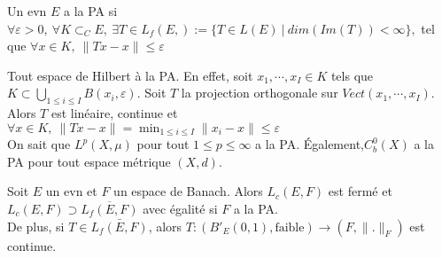 \begin{definition}
    Un evn $E$ a la PA si\\
    $\forall \varepsilon >0,\ \forall K\subset _CE,\ \exists T\in L_f(E,):=\{T\in L(E)\ |\ dim(Im(T))<\infty \} , $ tel que $\forall x\in K,\ \|Tx-x\|\le \varepsilon  $
\end{definition}
\begin{ex}
    Tout espace de Hilbert à la PA. En effet, soit $x_1,\cdots, x_I\in K$ tels que $K\subset \bigcup\limits_{1\le i\le I}B(x_i,\varepsilon ).$ Soit $T$ la projection orthogonale sur $Vect(x_1,\cdots,x_I).$ Alors $T$ est linéaire, continue et $\forall x\in K,\ \|Tx-x\|=\min_{1\le i\le I}\|x_i-x\|\le \varepsilon  $ \\
    On sait que $L^p(X,\mu)$ pour tout $1\le p\le \infty $ a la PA. \'Egalement,$C^0_b(X)$ a la PA pour tout espace métrique $(X,d).$
\end{ex}
\begin{propriete}
    Soit $E$ un evn et $F$ un espace de Banach. Alors $L_c(E,F)$ est fermé et $L_c(E,F)\supset \overline{L_f(E,F)}$ avec égalité si $F$ a la PA. \\
    De plus, si $T\in \bar{L_f(E,F)}$, alors $T:\left( B'_E(0,1), \text{faible} \right) \to (F,\|.\|_F)$ est continue.
\end{propriete}

